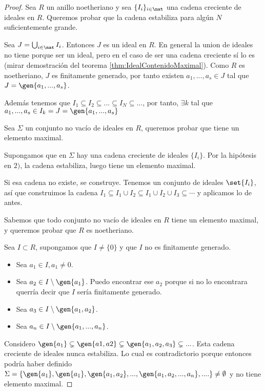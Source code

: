 \begin{proof}


		Sea $R$ un anillo noetheriano y sea $\{I_i\}_{i \in \nat}$ una cadena creciente de ideales en $R$. Queremos probar que la cadena estabiliza para algún $N$ suficientemente grande.

		Sea $J= \bigcup_{i \in \nat} I_i$. Entonces $J$  es un ideal en $R$. En general la union de ideales no tiene porque ser un ideal, pero en el caso de ser una cadena creciente sí lo es (mirar demostración del teorema \ref{thm:IdealContenidoMaximal}). Como $R$ es noetheriano, $J$ es finitamente generado, por tanto existen $a_1,...,a_s \in J$ tal que $J=\gen{a_1,...,a_s}$.

		Además tenemos que $I_1 \subseteq I_2 \subseteq ... \subseteq I_N \subseteq ...$, por tanto, $\exists k$ tal que  $a_1,...,a_s \in I_k = J = \gen{a_1,...,a_s}$


		Sea $\Sigma$ un conjunto no vacío de ideales en $R$, queremos probar que tiene un elemento maximal.

		Supongamos que en $\Sigma$ hay una cadena creciente de ideales $\{I_i\}$. Por la hipótesis en $2)$, la cadena estabiliza, luego tiene un elemento maximal.

		Si esa cadena no existe, se construye. Tenemos un conjunto de ideales $\set{I_i}$, así que construimos la cadena $I_1 ⊆ I_1 ∪ I_2 ⊆ I_1 ∪ I_2 ∪ I_3 ⊆ \dotsb$ y aplicamos lo de antes.


		Sabemos que todo conjunto no vacío de ideales en $R$ tiene un elemento maximal, y queremos probar que $R$ es noetheriano.

		Sea $I \subset R$, supongamos que $I\neq \{0\}$ y que $I$ no es finitamente generado.
		\begin{itemize}
			\item Sea $a_1 \in I, a_1 \neq 0$.
			\item Sea $a_2 \in I\setminus \gen{a_1}$. Puedo encontrar ese $a_2$ porque si no lo encontrara querría decir que $I$ sería finitamente generado.
			\item Sea $a_3 \in I\setminus \gen{a_1,a_2}$.
			\item Sea $a_n \in I\setminus \gen{a_1,...,a_n}$.
		\end{itemize}
		Considero $\gen{a_1}\subsetneq \gen{a1,a2} \subsetneq \gen{a_1,a_2,a_3} \subsetneq...$. Esta cadena creciente de ideales nunca estabiliza. Lo cual es contradictorio porque entonces podría haber definido $\Sigma=\{ \gen{a_1}, \gen{a_1},\gen{a_1,a_2},...,\gen{a_1,a_2,...,a_n},.... \} \neq \emptyset$ y no tiene elemento maximal.
\end{proof}

